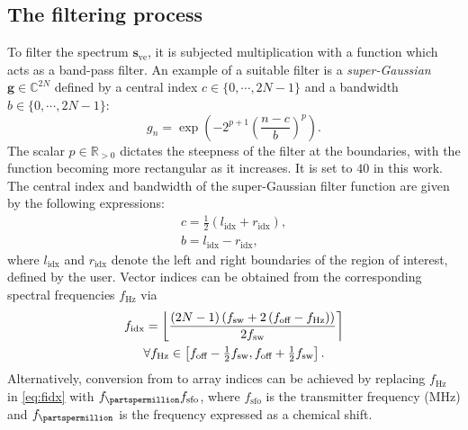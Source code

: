 \subsection{The filtering process}
To filter the spectrum $\symbf{s}_{\text{ve}}$, it is subjected multiplication
with a function which acts as a band-pass filter. An example of a suitable
filter is a \emph{super-Gaussian} $\symbf{g} \in \mathbb{C}^{2N}$ defined by a
central index  $c \in \lbrace 0, \cdots, 2N-1 \rbrace$ and a bandwidth $b \in
\lbrace 0, \cdots, 2N-1 \rbrace$:
\begin{equation}
    g_n = \exp \left(-2^{p+1} \left(\frac{n - c}{b}\right)^p\right).
    \label{eq:super-Gaussian-onedim}
\end{equation}
The scalar $p \in \mathbb{R}_{>0}$ dictates the steepness
of the filter at the boundaries, with the function becoming more rectangular
as it increases. It is set to $40$ in this work.
The central index and bandwidth of the super-Gaussian filter function are given
by the following expressions:
\begin{subequations}
    \begin{gather}
        c = \tfrac{1}{2} \left(l_{\text{idx}} + r_{\text{idx}}\right), \\
        b = l_{\text{idx}} - r_{\text{idx}},
    \end{gather}
\end{subequations}
where $l_{\text{idx}}$ and $r_{\text{idx}}$ denote the left and right
boundaries of the region of interest, defined by the user.
Vector indices can be obtained from the corresponding spectral frequencies
$f_{\unit{\hertz}}$ via
\begin{equation}
    \begin{gathered}
        f_{\text{idx}} =
            \left \lfloor
                \frac
                {
                    \left(2N - 1\right)
                    \left(\fsw + 2 \left(\foff - f_{\unit{\hertz}}\right) \right)
                }
                {2 \fsw}
            \right \rceil \\
        \forall f_{\unit{\hertz}} \in
            \left[\foff - \tfrac{1}{2} \fsw, \foff + \tfrac{1}{2} \fsw\right].
        \label{eq:fidx}
    \end{gathered}
\end{equation}
Alternatively, conversion from \unit{\partspermillion} to array indices can be
achieved by replacing  $f_{\unit{\hertz}}$ in \cref{eq:fidx} with
$f_{\unit{\partspermillion}} f_{\text{sfo}}$, where $f_{\text{sfo}}$ is the
transmitter frequency (\unit{\mega \hertz}) and $f_{\unit{\partspermillion}}$
is the frequency expressed as a chemical shift.

